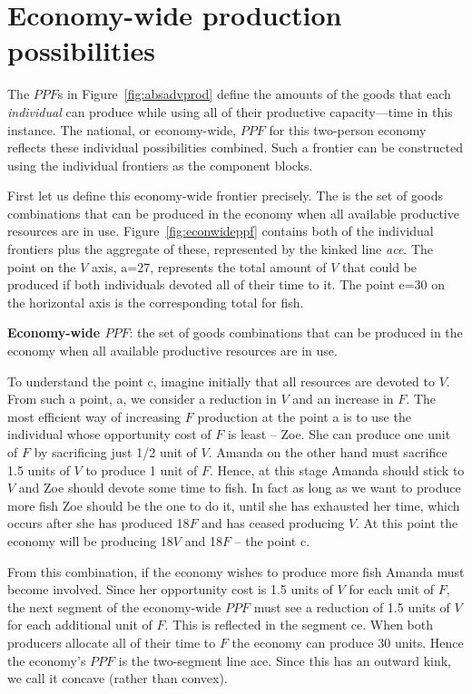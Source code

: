 \section{Economy-wide production possibilities}\label{sec:ch1sec5}

The $PPF$s in Figure~\ref{fig:absadvprod} define the amounts of the goods that each \textit{individual} can produce while using all of their productive capacity---time in this instance. The national, or economy-wide, $PPF$ for this two-person economy reflects these individual possibilities combined. Such a frontier can be constructed using the individual frontiers as the component blocks. 

First let us define this economy-wide frontier precisely. The  is the set of goods combinations that can be produced in the economy when all available productive resources are in use. Figure~\ref{fig:econwideppf} contains both of the individual frontiers plus the aggregate of these, represented by the kinked line \textit{ace}. The point on the $V$ axis, a=27, represents the total amount of $V$ that could be produced if both individuals devoted all of their time to it. The point e=30 on the horizontal axis is the corresponding total for fish.

\begin{DefBox}
\textbf{Economy-wide $PPF$}: the set of goods combinations that can be produced in the economy when all available productive resources are in use.
\end{DefBox}

To understand the point c, imagine initially that all resources are devoted to $V$. From such a point, a, we consider a reduction in $V$ and an increase in $F$. The most efficient way of increasing $F$ production at the point a is to use the individual whose opportunity cost of $F$ is least -- Zoe. She can produce one unit of $F$ by sacrificing just 1/2 unit of $V$. Amanda on the other hand must sacrifice 1.5 units of $V$ to produce 1 unit of $F$. Hence, at this stage Amanda should stick to $V$ and Zoe should devote some time to fish. In fact as long as we want to produce more fish Zoe should be the one to do it, until she has exhausted her time, which occurs after she has produced 18$F$ and has ceased producing $V$. At this point the economy will be producing 18$V$ and 18$F$ -- the point c.



From this combination, if the economy wishes to produce more fish Amanda must become involved. Since her opportunity cost is 1.5 units of $V$ for each unit of $F$, the next segment of the economy-wide $PPF$ must see a reduction of 1.5 units of $V$ for each additional unit of $F$. This is reflected in the segment ce. When both producers allocate all of their time to $F$ the economy can produce 30 units. Hence the economy's $PPF$ is the two-segment line ace. Since this has an outward kink, we call it concave (rather than convex).

